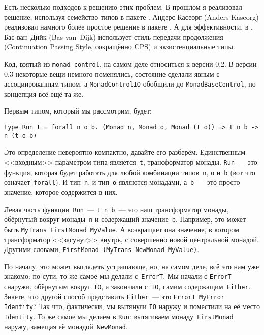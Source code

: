 Есть несколько подходов к решению этих проблем. В прошлом я реализовал решение,
используя семейство типов в пакете
.
Андерс Касеорг (Anders Kaseorg) реализовал намного более простое решение в пакете
.
А для эффективности, в
,
Бас ван~Дийк (Bas van~Dijk) использует стиль передачи продолжения (Continuation Passing Style,
сокращённо CPS) и экзистенциальные типы.

\begin{remark}
Код, взятый из \texttt{monad-control}, на самом деле относиться к версии 0.2. В
версии 0.3 некоторые вещи немного поменялись, состояние сделали явным с
ассоциированным типом, а \lstinline'MonadControlIO' обобщили до
\lstinline'MonadBaseControl', но концепция всё ещё та же.
\end{remark}

Первым типом, который мы рассмотрим, будет:

\begin{lstlisting}
type Run t = forall n o b. (Monad n, Monad o, Monad (t o)) => t n b -> n (t o b)
\end{lstlisting}

Это определение невероятно компактно, давайте его разберём. Единственным
<<входным>> параметром типа является~\lstinline't', трансформатор монады.
\lstinline'Run'~--- это функция, которая будет работать для любой комбинации
типов~\lstinline'n', \lstinline'o' и~\lstinline'b' (вот что
означает~\lstinline'forall'). И тип~\lstinline'n', и тип~\lstinline'o' являются
монадами, а~\lstinline'b'~--- это просто значение, которое содержится в них.

Левая часть функции~\lstinline'Run'~--- \lstinline't n b'~--- это наш
трансформатор монады, обёрнутый вокруг монады~\lstinline'n' и содержащий
значение~\lstinline'b'. Например, это может быть
\lstinline'MyTrans FirstMonad MyValue'.
А возвращает она значение, в котором трансформатор <<засунут>>
внутрь, с совершенно новой центральной монадой. Другими словами,
\lstinline'FirstMonad (MyTrans NewMonad MyValue)'.

По началу, это может выглядеть устрашающе, но, на самом деле, всё это нам уже
знакомо: по сути, то же самое мы делали с~\lstinline'ErrorT'. Мы начали с
\lstinline'ErrorT' снаружи, обёрнутым вокруг~\lstinline'IO', а закончили
с~\lstinline'IO', самим содержащим~\lstinline'Either'. Знаете, что другой
способ представить \lstinline'Either'~--- это
\lstinline'ErrorT MyError Identity'? Так что, фактически, мы вытянули
\lstinline'IO' наружу и поместили на её место \lstinline'Identity'. То же самое
мы делаем в \lstinline'Run': вытягиваем монаду~\lstinline'FirstMonad' наружу,
замещая её монадой~\lstinline'NewMonad'.

